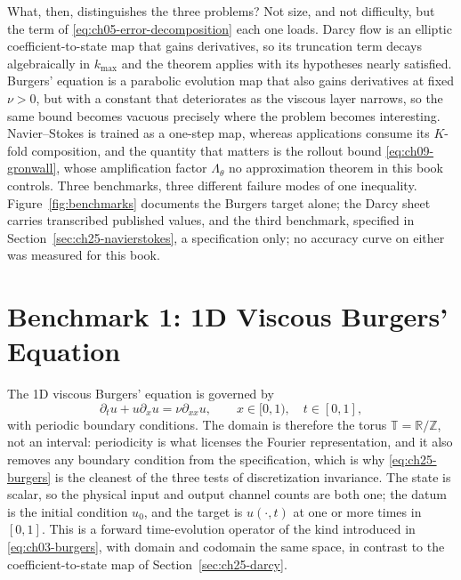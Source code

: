 What, then, distinguishes the three problems? Not size, and not difficulty, but
the term of \eqref{eq:ch05-error-decomposition} each one loads. Darcy flow is an
elliptic coefficient-to-state map that gains derivatives, so its truncation term
decays algebraically in $k_{\max}$ and the theorem applies with its hypotheses
nearly satisfied. Burgers' equation is a parabolic evolution map that also gains
derivatives at fixed $\nu > 0$, but with a constant that deteriorates as the
viscous layer narrows, so the same bound becomes vacuous precisely where the
problem becomes interesting. Navier--Stokes is trained as a one-step map, whereas
applications consume its $K$-fold composition, and the quantity that matters is
the rollout bound \eqref{eq:ch09-gronwall}, whose amplification factor
$\Lambda_{\theta}$ no approximation theorem in this book controls. Three
benchmarks, three different failure modes of one inequality. Figure~\ref{fig:benchmarks}
documents the Burgers target alone; the Darcy sheet carries transcribed
published values, and the third benchmark, specified in
Section~\ref{sec:ch25-navierstokes}, a specification only; no accuracy curve on
either was measured for this book.

\section{Benchmark 1: 1D Viscous Burgers' Equation}
\label{sec:ch25-burgers}

The 1D viscous Burgers' equation is governed by
\begin{equation}
  \label{eq:ch25-burgers}
  \partial_t u + u \partial_x u = \nu \partial_{xx} u, \qquad x \in [0, 1), \quad t \in [0, 1],
\end{equation}
with periodic boundary conditions. The domain is therefore the torus
$\mathbb{T} = \mathbb{R}/\mathbb{Z}$, not an interval: periodicity is what licenses
the Fourier representation, and it also removes any boundary condition from the
specification, which is why \eqref{eq:ch25-burgers} is the cleanest of the three
tests of discretization invariance. The state is scalar, so the physical input and
output channel counts are both one; the datum is the initial condition $u_0$, and
the target is $u(\cdot, t)$ at one or more times in $[0,1]$. This is a
forward time-evolution operator of the kind introduced in
\eqref{eq:ch03-burgers}, with domain and codomain the same space, in contrast to
the coefficient-to-state map of Section~\ref{sec:ch25-darcy}.

